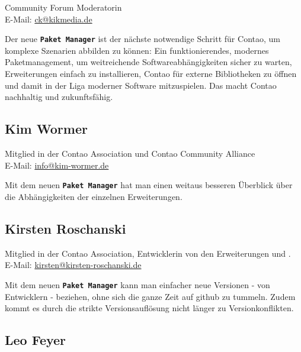 \documentclass[
paper=a4,
draft=false,%
fontsize=10pt%
]{scrartcl}
\newcommand{\packageManager}{\textbf{\texttt{Paket Manager}}}
\begin{document}
Community Forum Moderatorin \\
E-Mail: \href{mailto:ck@kikmedia.de}{ck@kikmedia.de}

\begin{emquote}{}
Der neue \packageManager{} ist der nächste notwendige Schritt für Contao, um komplexe Szenarien abbilden zu können:
Ein funktionierendes, modernes  Paketmanagement, um weitreichende Softwareabhängigkeiten sicher zu warten, Erweiterungen einfach zu installieren, Contao für externe Bibliotheken zu öffnen und damit in der Liga moderner Software mitzuspielen. Das macht Contao nachhaltig und zukunftsfähig.
\end{emquote}

\subsection*{Kim  Wormer}

Mitglied in der Contao Association und Contao Community Alliance \\
E-Mail: \href{mailto:info@kim-wormer.de}{info@kim-wormer.de}

\begin{emquote}{}
Mit dem neuen \packageManager{} hat man einen weitaus besseren Überblick über die Abhängigkeiten der einzelnen Erweiterungen.
\end{emquote}

\subsection*{Kirsten  Roschanski}

Mitglied in der Contao Association, Entwicklerin von den Erweiterungen  und .\\
E-Mail: \href{mailto:kirsten@kirsten-roschanski.de}{kirsten@kirsten-roschanski.de}

\begin{emquote}{}
Mit dem neuen \packageManager{} kann man einfacher neue Versionen - von Entwicklern - beziehen, ohne sich die ganze Zeit auf github zu tummeln. Zudem kommt es durch die strikte Versionsauflösung nicht länger zu Versionkonflikten.
\end{emquote}

\pagebreak

\subsection*{Leo  Feyer}
\end{document}
